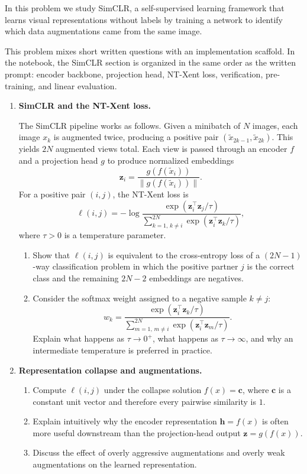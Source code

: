 \documentclass[submit]{../harvardml}
\begin{document}
\begin{problem}
In this problem we study SimCLR, a self-supervised learning framework that learns visual representations without labels by training a network to identify which data augmentations came from the same image.

This problem mixes short written questions with an implementation scaffold. In the notebook, the SimCLR section is organized in the same order as the written prompt: encoder backbone, projection head, NT-Xent loss, verification, pre-training, and linear evaluation.

\begin{enumerate}[leftmargin=*]
\item \textbf{SimCLR and the NT-Xent loss.}

The SimCLR pipeline works as follows. Given a minibatch of \(N\) images, each image \(x_k\) is augmented twice, producing a positive pair \((\tilde{x}_{2k-1}, \tilde{x}_{2k})\). This yields \(2N\) augmented views total. Each view is passed through an encoder \(f\) and a projection head \(g\) to produce normalized embeddings
\[
\mathbf{z}_i = \frac{g(f(\tilde{x}_i))}{\|g(f(\tilde{x}_i))\|}.
\]
For a positive pair \((i,j)\), the NT-Xent loss is
\[
\ell(i,j) = -\log \frac{\exp(\mathbf{z}_i^\top \mathbf{z}_j / \tau)}{\sum_{k=1,\,k\neq i}^{2N} \exp(\mathbf{z}_i^\top \mathbf{z}_k / \tau)},
\]
where \(\tau > 0\) is a temperature parameter.

\begin{enumerate}[label=(\alph*)]
    \item Show that \(\ell(i,j)\) is equivalent to the cross-entropy loss of a \((2N-1)\)-way classification problem in which the positive partner \(j\) is the correct class and the remaining \(2N-2\) embeddings are negatives.
    \item Consider the softmax weight assigned to a negative sample \(k \neq j\):
    \[
    w_k = \frac{\exp(\mathbf{z}_i^\top \mathbf{z}_k / \tau)}{\sum_{m=1,\,m\neq i}^{2N} \exp(\mathbf{z}_i^\top \mathbf{z}_m / \tau)}.
    \]
    Explain what happens as \(\tau \to 0^+\), what happens as \(\tau \to \infty\), and why an intermediate temperature is preferred in practice.
\end{enumerate}

\item \textbf{Representation collapse and augmentations.}
\begin{enumerate}[label=(\alph*)]
    \item Compute \(\ell(i,j)\) under the collapse solution \(f(x)=\mathbf c\), where \(\mathbf c\) is a constant unit vector and therefore every pairwise similarity is \(1\).
    \item Explain intuitively why the encoder representation \(\mathbf h=f(x)\) is often more useful downstream than the projection-head output \(\mathbf z=g(f(x))\).
    \item Discuss the effect of overly aggressive augmentations and overly weak augmentations on the learned representation.
\end{enumerate}


\end{enumerate}
\end{problem}
\end{document}
